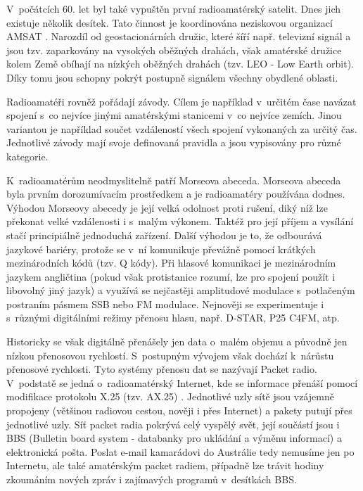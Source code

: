V~počátcích 60. let byl také vypuštěn první radioamatérský satelit. Dnes jich existuje několik desítek.
Tato činnost je koordinována neziskovou organizací AMSAT \cite{amsat}. %
Narozdíl od geostacionárních družic, které šíří např. televizní
signál a jsou tzv. zaparkovány na vysokých oběžných drahách, však amatérské
družice kolem Země obíhají na nízkých oběžných drahách (tzv. LEO - Low Earth
orbit). %
Díky tomu jsou schopny pokrýt postupně signálem všechny obydlené oblasti.

Radioamatéři rovněž pořádají závody. Cílem je například v~určitém čase navázat spojení s~co nejvíce jinými
amatérskými stanicemi v~co nejvíce zemích. Jinou variantou je například součet vzdáleností všech spojení vykonaných za určitý
čas. Jednotlivé závody mají svoje definovaná pravidla a jsou vypisovány pro
různé kategorie.

K~radioamatérům neodmyslitelně patří Morseova abeceda. Morseova abeceda byla
prvním dorozumívacím prostředkem a je radioamatéry používána dodnes.
Výhodou Morseovy %
abecedy je její velká odolnost proti rušení, diký níž lze překonat velké vzdálenosti i s~malým
výkonem. Taktéž pro její příjem a vysílání stačí principiálně jednoduchá
zařízení. Další výhodou je to, že odbourává
jazykové bariéry, protože se v~ní komunikuje
převážně pomocí krátkých mezinárodních kódů (tzv. Q kódy). Při hlasové komunikaci
je mezinárodním jazykem angličtina (pokud však protistanice rozumí, lze pro
spojení použít i libovolný jiný jazyk) a využívá se nejčastěji amplitudové
modulace s~potlačeným postraním pásmem SSB
nebo FM modulace. Nejnověji se experimentuje i s~různými digitálními režimy
přenosu hlasu, např. D-STAR, %
P25 C4FM, atp.

Historicky se však digitálně přenášely jen data o~malém objemu a původně jen nízkou
přenosovou rychlostí. S~postupným vývojem však dochází k~nárůstu přenosové
rychlosti. Tyto systémy přenosu dat se nazývají Packet radio. V~podstatě se jedná
o~radioamatérský Internet, kde se informace přenáší pomocí modifikace protokolu
X.25 (tzv. AX.25) \cite{ax25}. %
Jednotlivé uzly sítě jsou vzájemně propojeny (většinou radiovou cestou, nověji i
přes Internet) a pakety putují přes jednotlivé uzly.
Síť packet radia pokrývá celý vyspělý svět, její součástí jsou i BBS (Bulletin
board system - databanky pro ukládání a výměnu informací) a
elektronická pošta. Poslat e-mail kamarádovi do Austrálie tedy nemusíme jen po Internetu,
ale také amatérským packet radiem, případně lze trávit hodiny zkoumáním nových zpráv i
zajímavých programů v~desítkách BBS.

